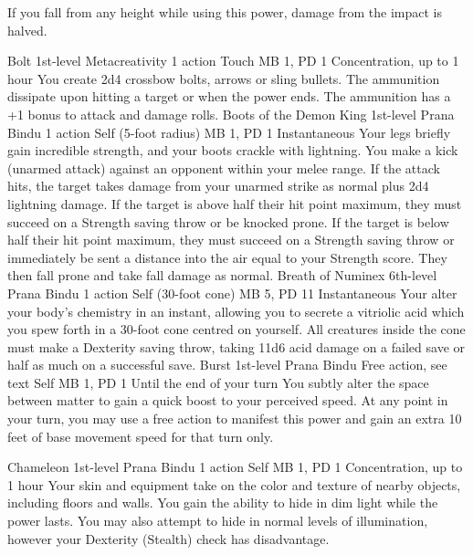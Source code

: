 If you fall from any height while using this power, damage
from the impact is halved.

\DndPowerHeader%
    {Bolt\label{pwr:bolt}}
    {1st-level Metacreativity}
    {1 action}
    {Touch}
    {MB 1, PD 1}
    {Concentration, up to 1 hour}
You create 2d4 crossbow bolts, arrows or
sling bullets. The ammunition dissipate upon hitting a target
or when the power ends. The ammunition has a +1 bonus to attack
and damage rolls.
\DndPowerHeader%
    {Boots of the Demon King\label{pwr:boots_of_the_demon_king}}
    {1st-level Prana Bindu}
    {1 action}
    {Self (5-foot radius)}
    {MB 1, PD 1}
    {Instantaneous}
Your legs briefly gain incredible strength,
and your boots crackle with lightning. You make a kick (unarmed
attack) against an opponent within your melee range. If the
attack hits, the target takes damage from your unarmed strike
as normal plus 2d4 lightning damage. If the target is above
half their hit point maximum, they must succeed on a Strength
saving throw or be knocked prone. If the target is below half
their hit point maximum, they must succeed on a Strength saving
throw or immediately be sent a distance into the air equal
to your Strength score. They then fall prone and take fall
damage as normal.
\DndPowerHeader%
    {Breath of Numinex\label{pwr:breath_of_numinex}}
    {6th-level Prana Bindu}
    {1 action}
    {Self (30-foot cone)}
    {MB 5, PD 11}
    {Instantaneous}
Your alter your body's chemistry in an instant,
allowing you to secrete a vitriolic acid which you spew forth
in a 30-foot cone centred on yourself. All creatures inside
the cone must make a Dexterity saving throw, taking 11d6 acid
damage on a failed save or half as much on a successful save.
\DndPowerHeader%
    {Burst\label{pwr:burst}}
    {1st-level Prana Bindu}
    {Free action, see text}
    {Self}
    {MB 1, PD 1}
    {Until the end of your turn}
You subtly alter the space between matter
to gain a quick boost to your perceived speed. At any point
in your turn, you may use a free action to manifest this power
and gain an extra 10 feet of base movement speed for that
turn only.

\DndPowerHeader%
    {Chameleon\label{pwr:chameleon}}
    {1st-level Prana Bindu}
    {1 action}
    {Self}
    {MB 1, PD 1}
    {Concentration, up to 1 hour}
Your skin and equipment take on the color
and texture of nearby objects, including floors and walls.
You gain the ability to hide in dim light while the power
lasts. You may also attempt to hide in normal levels of illumination,
however your Dexterity (Stealth) check has disadvantage.

